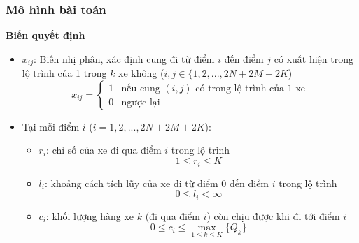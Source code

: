 \documentclass{beamer}
\begin{document}
	\begin{frame}
		\frametitle{Mô hình bài toán}
		\textbf{\underline{Biến quyết định}}
		\begin{itemize}
			\item $x_{ij}$: Biến nhị phân, xác định cung đi từ điểm $i$ đến điểm $j$ có xuất hiện trong lộ trình của 1 trong $k$ xe không ($i,j\in \{1,2,...,2N+2M+2K$)
			\begin{equation}
				x_{ij} = 
				\begin{cases}
				1 & \text{nếu cung $(i,j)$ có trong lộ trình của 1 xe}\\
				0 & \text{ngược lại}
				\end{cases}
			\end{equation}
			\item Tại mỗi điểm $i$ ($i=1,2,...,2N+2M+2K$):
			\begin{itemize}
				\item $r_i$: chỉ số của xe đi qua điểm $i$ trong lộ trình
					\begin{equation}
					1\leq r_i\leq K
					\end{equation}
				\item $l_i$: khoảng cách tích lũy của xe đi từ điểm $0$ đến điểm $i$ trong lộ trình
					\begin{equation}
					0\leq l_i < \infty
					\end{equation}
				\item $c_i$: khối lượng hàng xe $k$ (đi qua điểm $i$) còn chịu được khi đi tới điểm $i$
					\begin{equation}
					0\leq c_i\leq \max _{1\leq k\leq K} \{Q_k\}
					\end{equation}
			\end{itemize}
		\end{itemize}
	\end{frame}
\end{document}
